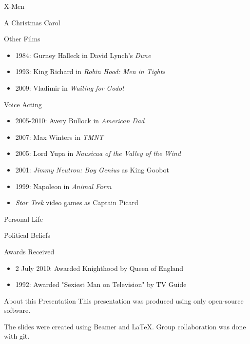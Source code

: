 \documentclass[xcolor=dvipsnames]{beamer}
\begin{document}
\begin{frame}{X-Men}

\end{frame}

\begin{frame}{A Christmas Carol}

\end{frame}

\begin{frame}{Other Films}
  \begin{itemize}
    \item 1984: Gurney Halleck in David Lynch's \emph{Dune}
    \item 1993: King Richard in \emph{Robin Hood: Men in Tights}
    \item 2009: Vladimir in \emph{Waiting for Godot}
  \end{itemize}
\end{frame}

\begin{frame}{Voice Acting}
  \begin{itemize} 
    \item 2005-2010: Avery Bullock in \emph{American Dad}
    \item 2007: Max Winters in \emph{TMNT}
    \item 2005: Lord Yupa in \emph{Nausicaa of the Valley of the Wind}
    \item 2001: \emph{Jimmy Neutron: Boy Genius} as King Goobot
    \item 1999: Napoleon in \emph{Animal Farm}
    \item \emph{Star Trek} video games as Captain Picard
  \end{itemize}
\end{frame}

\begin{frame}{Personal Life}
  \begin{itemize}
  \end{itemize}
\end{frame}

\begin{frame}{Political Beliefs}

\end{frame}

\begin{frame}{Awards Received}
  \begin{itemize}
    \item 2 July 2010: Awarded Knighthood by Queen of England
    \item 1992: Awarded "Sexiest Man on Television" by TV Guide
  \end{itemize}
\end{frame}
\begin{frame}{About this Presentation}
  This presentation was produced using only open-source software.

  The slides were created using Beamer and LaTeX.
  Group collaboration was done with git.
\end{frame}
\end{document}
